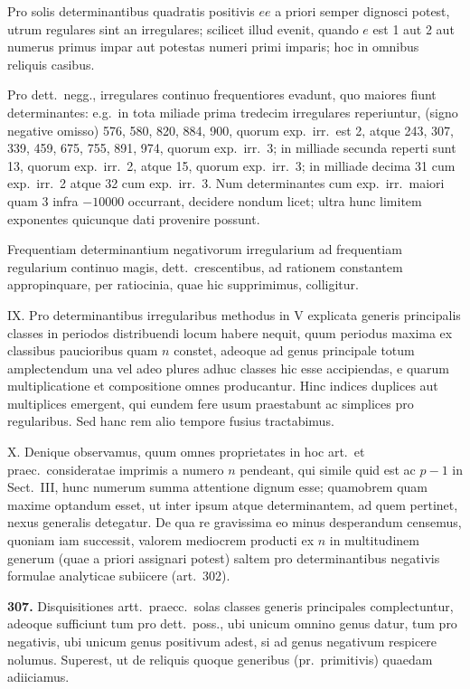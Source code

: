 \documentclass[12pt,a4paper]{article}
\theoremstyle{plain}
\theoremstyle{definition}
\theoremstyle{remark}
\begin{document}
Pro solis determinantibus quadratis positivis $ee$ a priori semper dignosci potest, utrum regulares sint an irregulares; scilicet illud evenit, quando $e$ est 1 aut 2 aut numerus primus impar aut potestas numeri primi imparis; hoc in omnibus reliquis casibus.

Pro dett.~negg., irregulares continuo frequentiores evadunt, quo maiores fiunt determinantes: e.g.~in tota miliade prima tredecim irregulares reperiuntur, (signo negative omisso) 576, 580, 820, 884, 900, quorum exp.~irr.~est 2, atque 243, 307, 339, 459, 675, 755, 891, 974, quorum exp.~irr.~3; in milliade secunda reperti sunt 13, quorum exp.~irr.~2, atque 15, quorum exp.~irr.~3; in milliade decima 31 cum exp.~irr.~2 atque 32 cum exp.~irr.~3. Num determinantes cum exp.~irr.~maiori quam 3 infra $-10000$ occurrant, decidere nondum licet; ultra hunc limitem exponentes quicunque dati provenire possunt.

Frequentiam determinantium negativorum irregularium ad frequentiam regularium continuo magis, dett.~crescentibus, ad rationem constantem appropinquare, per ratiocinia, quae hic supprimimus, colligitur.

\textsc{IX.} Pro determinantibus irregularibus methodus in V explicata generis principalis classes in periodos distribuendi locum habere nequit, quum periodus maxima ex classibus paucioribus quam $n$ constet, adeoque ad genus principale totum amplectendum una vel adeo plures adhuc classes hic esse accipiendas, e quarum multiplicatione et compositione omnes producantur. Hinc indices duplices aut multiplices emergent, qui eundem fere usum praestabunt ac simplices pro regularibus. Sed hanc rem alio tempore fusius tractabimus.

\textsc{X.} Denique observamus, quum omnes proprietates in hoc art.~et praec.~consideratae imprimis a numero $n$ pendeant, qui simile quid est ac $p-1$ in Sect.~III, hunc numerum summa attentione dignum esse; quamobrem quam maxime optandum esset, ut inter ipsum atque determinantem, ad quem pertinet, nexus generalis detegatur. De qua re gravissima eo minus desperandum censemus, quoniam iam successit, valorem mediocrem producti ex $n$ in multitudinem generum (quae a priori assignari potest) saltem pro determinantibus negativis formulae analyticae subiicere (art.~302).

\textbf{307.} Disquisitiones artt.~praecc.~solas classes generis principales complectuntur, adeoque sufficiunt tum pro dett.~poss., ubi unicum omnino genus datur, tum pro negativis, ubi unicum genus positivum adest, si ad genus negativum respicere nolumus. Superest, ut de reliquis quoque generibus (pr.~primitivis) quaedam adiiciamus.
\end{document}
